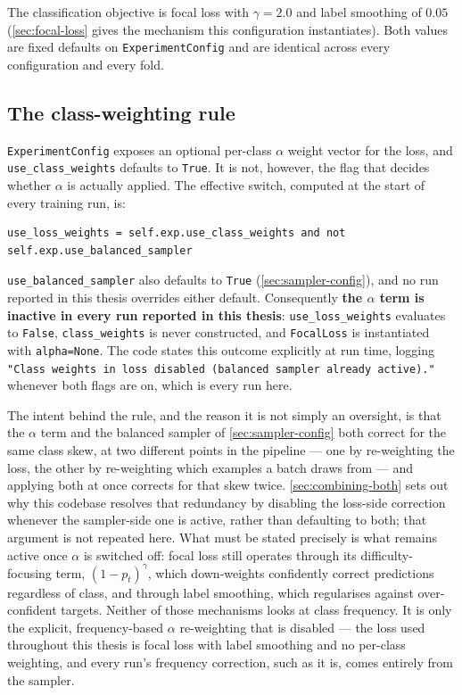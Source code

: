 The classification objective is focal loss with $\gamma = 2.0$ and label smoothing of $0.05$ (\autoref{sec:focal-loss} gives the mechanism this configuration instantiates). Both values are fixed defaults on \texttt{ExperimentConfig} and are identical across every configuration and every fold.

\subsection{The class-weighting rule}
\label{sec:class-weighting-rule}

\texttt{ExperimentConfig} exposes an optional per-class $\alpha$ weight vector for the loss, and \texttt{use\_class\_weights} defaults to \texttt{True}. It is not, however, the flag that decides whether $\alpha$ is actually applied. The effective switch, computed at the start of every training run, is:

\begin{verbatim}
use_loss_weights = self.exp.use_class_weights and not self.exp.use_balanced_sampler
\end{verbatim}

\texttt{use\_balanced\_sampler} also defaults to \texttt{True} (\autoref{sec:sampler-config}), and no run reported in this thesis overrides either default. Consequently \textbf{the $\alpha$ term is inactive in every run reported in this thesis}: \texttt{use\_loss\_weights} evaluates to \texttt{False}, \texttt{class\_weights} is never constructed, and \texttt{FocalLoss} is instantiated with \texttt{alpha=None}. The code states this outcome explicitly at run time, logging \texttt{"Class weights in loss disabled (balanced sampler already active)."} whenever both flags are on, which is every run here.

The intent behind the rule, and the reason it is not simply an oversight, is that the $\alpha$ term and the balanced sampler of \autoref{sec:sampler-config} both correct for the same class skew, at two different points in the pipeline --- one by re-weighting the loss, the other by re-weighting which examples a batch draws from --- and applying both at once corrects for that skew twice. \autoref{sec:combining-both} sets out why this codebase resolves that redundancy by disabling the loss-side correction whenever the sampler-side one is active, rather than defaulting to both; that argument is not repeated here. What must be stated precisely is what remains active once $\alpha$ is switched off: focal loss still operates through its difficulty-focusing term, $(1-p_t)^\gamma$, which down-weights confidently correct predictions regardless of class, and through label smoothing, which regularises against over-confident targets. Neither of those mechanisms looks at class frequency. It is only the explicit, frequency-based $\alpha$ re-weighting that is disabled --- the loss used throughout this thesis is focal loss with label smoothing and no per-class weighting, and every run's frequency correction, such as it is, comes entirely from the sampler.

